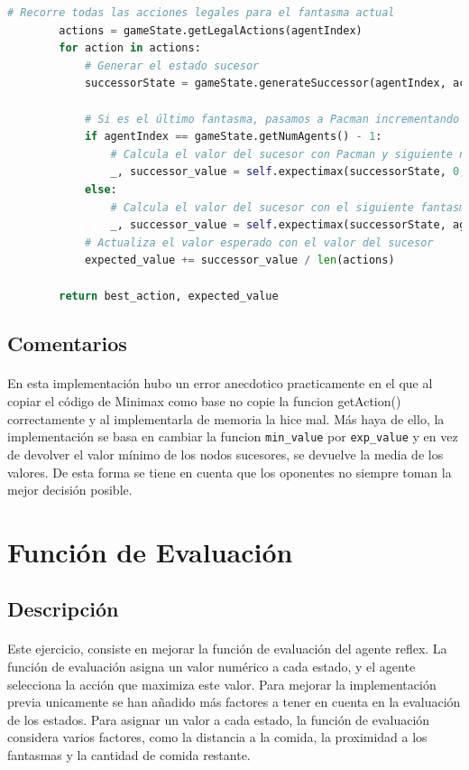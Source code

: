 \documentclass{report}
\begin{document}
\begin{lstlisting}[language=Python, caption=Implementación final del agente Expectimax]
        # Recorre todas las acciones legales para el fantasma actual
        actions = gameState.getLegalActions(agentIndex)
        for action in actions:
            # Generar el estado sucesor
            successorState = gameState.generateSuccessor(agentIndex, action)
            
            # Si es el último fantasma, pasamos a Pacman incrementando la profundidad
            if agentIndex == gameState.getNumAgents() - 1:
                # Calcula el valor del sucesor con Pacman y siguiente nivel de profundidad
                _, successor_value = self.expectimax(successorState, 0, depth + 1)
            else:
                # Calcula el valor del sucesor con el siguiente fantasma
                _, successor_value = self.expectimax(successorState, agentIndex + 1, depth)
            # Actualiza el valor esperado con el valor del sucesor
            expected_value += successor_value / len(actions)

        return best_action, expected_value            
            \end{lstlisting}
        \subsection*{Comentarios}
          \paragraph*{}{
            En esta implementación hubo un error anecdotico practicamente en el que al copiar el código de Minimax como base no copie la funcion getAction() correctamente y al implementarla de memoria la hice mal.
            Más haya de ello, la implementación se basa en cambiar la funcion \texttt{min\_value} por \texttt{exp\_value} y en vez de devolver el valor mínimo de los nodos sucesores, se devuelve la media de los valores.
            De esta forma se tiene en cuenta que los oponentes no siempre toman la mejor decisión posible.
          }
      \clearpage\section{Función de Evaluación}
        \subsection*{Descripción}
          \paragraph*{}{
            Este ejercicio, consiste en mejorar la función de evaluación del agente reflex. 
            La función de evaluación asigna un valor numérico a cada estado, y el agente selecciona la acción que maximiza este valor. 
            Para mejorar la implementación previa unicamente se han añadido más factores a tener en cuenta en la evaluación de los estados.
            Para asignar un valor a cada estado, la función de evaluación considera varios factores, como la distancia a la comida, la proximidad a los fantasmas y la cantidad de comida restante.
          }
\end{document}

